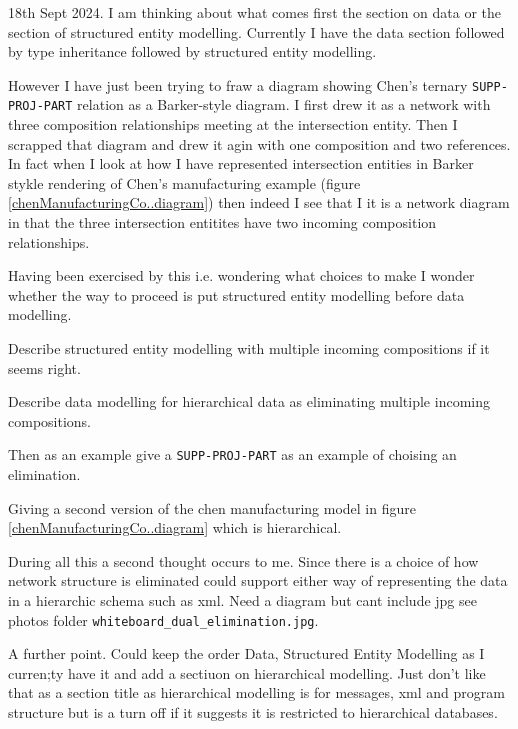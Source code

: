 \begin{noteforfuture}
18th Sept 2024. I am thinking about what comes first the section on data or the section of structured
entity modelling. 
Currently I have the data section followed by type inheritance followed by structured entity modelling. 

However I have just been trying to fraw a diagram showing Chen's ternary \verb'SUPP-PROJ-PART' relation as a Barker-style diagram. I first drew it as a network with three composition relationships meeting at the intersection entity. Then I scrapped that diagram and drew it agin with one composition and two references. In fact when I look at how I have represented intersection entities in Barker stykle rendering of Chen's manufacturing example (figure \ref{chenManufacturingCo..diagram}) then indeed I see that I it is a network diagram in that the three intersection entitites have two incoming composition relationships. 

Having been exercised by this i.e. wondering what choices to make I wonder whether the way to proceed is put structured entity modelling before data modelling.

Describe structured entity modelling with multiple incoming compositions if it seems right.

Describe data modelling for hierarchical data as eliminating multiple incoming compositions.

Then as an example give a \verb'SUPP-PROJ-PART' as an example of choising an elimination.

Giving a second version of the chen manufacturing model in figure \ref{chenManufacturingCo..diagram}
which is hierarchical.

During all this a second thought occurs to me. Since there is a choice of how network structure is eliminated could support either way of representing the data in a hierarchic schema such as xml.
 Need a diagram but cant include jpg see photos folder \verb'whiteboard_dual_elimination.jpg'.

A further point.
Could keep the order Data, Structured Entity Modelling as I curren;ty have it and add a sectiuon on hierarchical modelling. Just don't like that as a section title as hierarchical modelling is for messages, xml and program structure but is a turn off if it suggests it is restricted to hierarchical databases.

\end{noteforfuture}